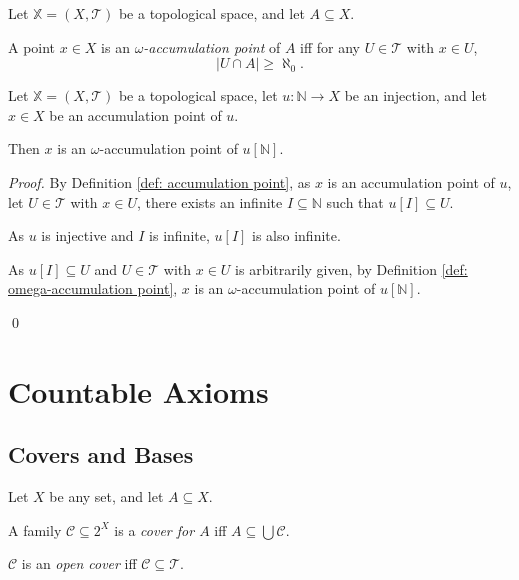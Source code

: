 \begin{definition}
	\label{def: omega-accumulation point}
	Let $\mathbb X = (X, \mathcal T)$ be a topological space, and let $A \subseteq X$.
	
	A point $x \in X$ is an \textit{$\omega$-accumulation point} of $A$ iff for any $U \in \mathcal T$ with $x \in U$,
	$$
	|U \cap A| \ge \aleph_0.
	$$
\end{definition}


\begin{proposition}
	Let $\mathbb X = (X, \mathcal T)$ be a topological space, let $u: \mathbb N \to X$ be an injection, and let $x \in X$ be an accumulation point of $u$.
	
	Then $x$ is an $\omega$-accumulation point of $u[\mathbb N]$.
	
	\begin{proof}
		By Definition \ref{def: accumulation point}, as $x$ is an accumulation point of $u$, let $U \in \mathcal T$ with $x \in U$, there exists an infinite $I \subseteq \mathbb N$ such that $u[I] \subseteq U$.
		
		As $u$ is injective and $I$ is infinite, $u[I]$ is also infinite.
		
		As $u[I] \subseteq U$ and $U \in \mathcal T$ with $x \in U$ is arbitrarily given, by Definition \ref{def: omega-accumulation point}, $x$ is an $\omega$-accumulation point of $u[\mathbb N]$.
		
		\qed
	\end{proof}
\end{proposition}


\chapter{Countable Axioms}


\section{Covers and Bases}


\begin{definition}
	\label{def: cover}
	Let $X$ be any set, and let $A \subseteq X$.
	
	A family $\mathcal C \subseteq 2^X$ is a \textit{cover for $A$} iff $A \subseteq \bigcup \mathcal C$.
	
	$\mathcal C$ is an \textit{open cover} iff $\mathcal C \subseteq \mathcal T$.
\end{definition}


